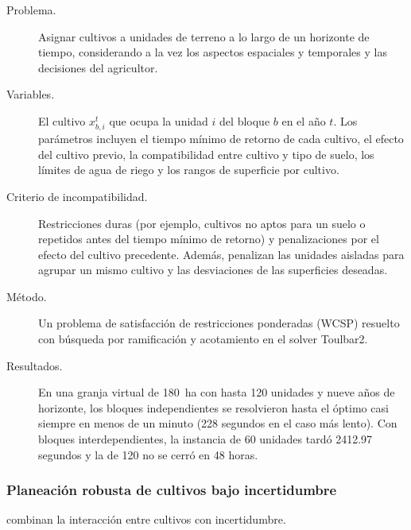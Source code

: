 \begin{description}
  \item[Problema.] Asignar cultivos a unidades de terreno a lo largo de un horizonte de tiempo, considerando a la vez los aspectos espaciales y temporales y las decisiones del agricultor.
  \item[Variables.] El cultivo $x^{t}_{b,i}$ que ocupa la unidad $i$ del bloque $b$ en el año $t$. Los parámetros incluyen el tiempo mínimo de retorno de cada cultivo, el efecto del cultivo previo, la compatibilidad entre cultivo y tipo de suelo, los límites de agua de riego y los rangos de superficie por cultivo.
  \item[Criterio de incompatibilidad.] Restricciones duras (por ejemplo, cultivos no aptos para un suelo o repetidos antes del tiempo mínimo de retorno) y penalizaciones por el efecto del cultivo precedente. Además, penalizan las unidades aisladas para agrupar un mismo cultivo y las desviaciones de las superficies deseadas.
  \item[Método.] Un problema de satisfacción de restricciones ponderadas (WCSP) resuelto con búsqueda por ramificación y acotamiento en el solver Toulbar2.
  \item[Resultados.] En una granja virtual de 180~ha con hasta 120 unidades y nueve años de horizonte, los bloques independientes se resolvieron hasta el óptimo casi siempre en menos de un minuto (228 segundos en el caso más lento). Con bloques interdependientes, la instancia de 60 unidades tardó 2412.97 segundos y la de 120 no se cerró en 48 horas.
\end{description}

\subsubsection{Planeación robusta de cultivos bajo incertidumbre}

\textcite{liu2026} combinan la interacción entre cultivos con incertidumbre.

